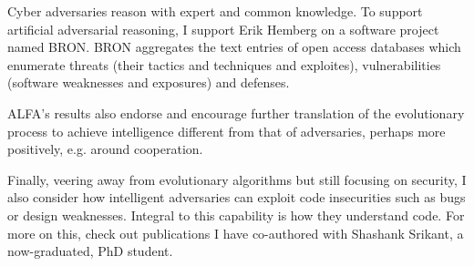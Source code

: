 \documentclass[12pt,bibliography=numbered]{article}
\renewcommand{\footnote}{\endnote}
\begin{document}


Cyber adversaries reason with expert and common knowledge. To support artificial adversarial reasoning, I support Erik Hemberg on a software project named BRON. BRON  aggregates the text entries of open access databases which enumerate threats (their tactics and techniques and exploites), vulnerabilities (software weaknesses and exposures) and defenses. 
 

ALFA's results also endorse and encourage further translation of the evolutionary process to achieve intelligence different from that of adversaries, perhaps more positively, e.g. around cooperation.  

Finally, veering away from evolutionary algorithms but still focusing on security, I also consider how intelligent adversaries can exploit code insecurities such as bugs or design weaknesses. Integral to this capability is how they understand code.  For more on this, check out publications I have co-authored with Shashank Srikant, a now-graduated, PhD student.
\end{document}
